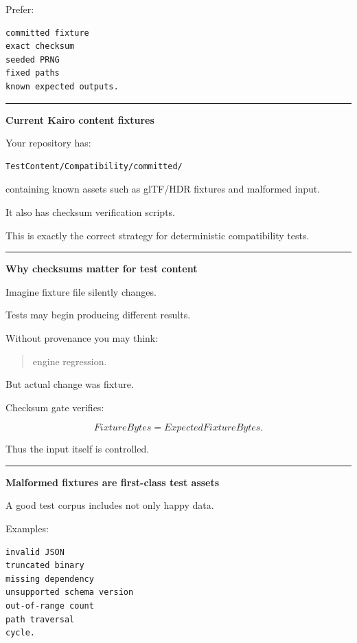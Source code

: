 Prefer:

\begin{verbatim}
committed fixture
exact checksum
seeded PRNG
fixed paths
known expected outputs.
\end{verbatim}

\begin{center}\rule{0.5\linewidth}{0.5pt}\end{center}

\textbf{Current Kairo content fixtures}

Your repository has:

\begin{verbatim}
TestContent/Compatibility/committed/
\end{verbatim}

containing known assets such as glTF/HDR fixtures and malformed input.

It also has checksum verification scripts.

This is exactly the correct strategy for deterministic compatibility tests.

\begin{center}\rule{0.5\linewidth}{0.5pt}\end{center}

\textbf{Why checksums matter for test content}

Imagine fixture file silently changes.

Tests may begin producing different results.

Without provenance you may think:

\begin{quote}
engine regression.
\end{quote}

But actual change was fixture.

Checksum gate verifies:

\[
FixtureBytes=
ExpectedFixtureBytes.
\]

Thus the input itself is controlled.

\begin{center}\rule{0.5\linewidth}{0.5pt}\end{center}

\textbf{Malformed fixtures are first-class test assets}

A good test corpus includes not only happy data.

Examples:

\begin{verbatim}
invalid JSON
truncated binary
missing dependency
unsupported schema version
out-of-range count
path traversal
cycle.
\end{verbatim}

